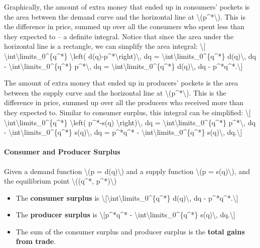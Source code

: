 Graphically, the amount of extra money that ended up in consumers'
pockets is the area between the demand curve and the horizontal line at
\textbackslash{}(p\^{}*\textbackslash{}). This is the difference in
price, summed up over all the consumers who spent less than they
expected to -- a definite integral. Notice that since the area under the
horizontal line is a rectangle, we can simplify the area integral:
\textbackslash{}{[}
\textbackslash{}int\textbackslash{}limits\_0\^{}\{q\^{}*\}
\textbackslash{}left( d(q)-p\^{}*\textbackslash{}right)\textbackslash{},
dq = \textbackslash{}int\textbackslash{}limits\_0\^{}\{q\^{}*\}
d(q)\textbackslash{}, dq -
\textbackslash{}int\textbackslash{}limits\_0\^{}\{q\^{}*\}
p\^{}*\textbackslash{}, dq =
\textbackslash{}int\textbackslash{}limits\_0\^{}\{q\^{}*\}
d(q)\textbackslash{}, dq - p\^{}*q\^{}*.\textbackslash{}{]}

The amount of extra money that ended up in producers' pockets is the
area between the supply curve and the horizontal line at
\textbackslash{}(p\^{}*\textbackslash{}). This is the difference in
price, summed up over all the producers who received more than they
expected to. Similar to consumer surplus, this integral can be
simplified: \textbackslash{}{[}
\textbackslash{}int\textbackslash{}limits\_0\^{}\{q\^{}*\}
\textbackslash{}left( p\^{}*-s(q)
\textbackslash{}right)\textbackslash{}, dq =
\textbackslash{}int\textbackslash{}limits\_0\^{}\{q\^{}*\}
p\^{}*\textbackslash{}, dq -
\textbackslash{}int\textbackslash{}limits\_0\^{}\{q\^{}*\}
s(q)\textbackslash{}, dq = p\^{}*q\^{}* -
\textbackslash{}int\textbackslash{}limits\_0\^{}\{q\^{}*\}
s(q)\textbackslash{}, dq.\textbackslash{}{]}

\hypertarget{consumer-and-producer-surplus-1}{%
\paragraph{Consumer and Producer
Surplus}\label{consumer-and-producer-surplus-1}}

Given a demand function \textbackslash{}(p = d(q)\textbackslash{}) and a
supply function \textbackslash{}(p = s(q)\textbackslash{}), and the
equilibrium point \textbackslash{}((q\^{}*, p\^{}*)\textbackslash{})

\begin{itemize}
\tightlist
\item
  The \textbf{consumer surplus} is
  \textbackslash{}{[}\textbackslash{}int\textbackslash{}limits\_0\^{}\{q\^{}*\}
  d(q)\textbackslash{}, dq - p\^{}*q\^{}*.\textbackslash{}{]}
\item
  The \textbf{producer surplus} is \textbackslash{}{[}p\^{}*q\^{}* -
  \textbackslash{}int\textbackslash{}limits\_0\^{}\{q\^{}*\}
  s(q)\textbackslash{}, dq.\textbackslash{}{]}
\item
  The sum of the consumer surplus and producer surplus is the
  \textbf{total gains from trade}.
\end{itemize}

